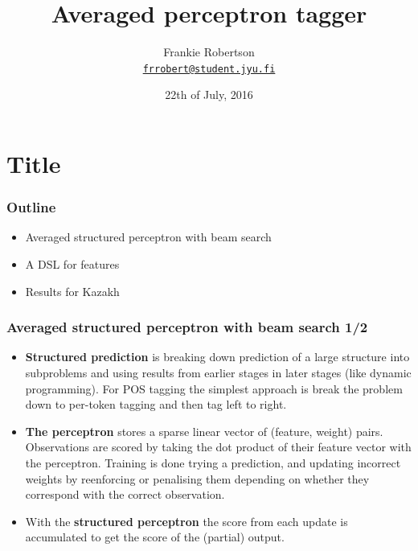 \documentclass{beamer}
\title[POS tagger internals]{Averaged perceptron tagger}
\institute[JYU]{University of Jyväskylä\\
\vspace{5mm}
\url{https://www.github.com/frankier/perceptron-tagger-slides/}}
\author[Frankie Robertson]{Frankie Robertson\texorpdfstring{\\
\href{mailto:frrobert@student.jyu.fi}{\texttt{frrobert@student.jyu.fi}}}{}}
\date{22th of July, 2016}
\begin{document}
\section{Title}
\begin{frame}
  \titlepage{}
\end{frame}

\begin{frame}
\frametitle{Outline}
\begin{itemize}

  \item Averaged structured perceptron with beam search

  \item A DSL for features

  \item Results for Kazakh

\end{itemize}
\end{frame}

\begin{frame}
\frametitle{Averaged structured perceptron with beam search 1/2}
\begin{itemize}

  \item \textbf{Structured prediction} is breaking down prediction of a large
    structure into subproblems and using results from earlier stages in later
    stages (like dynamic programming). For POS tagging the simplest approach is
    break the problem down to per-token tagging and then tag left to right.

  \item \textbf{The perceptron} stores a sparse linear vector of (feature,
    weight) pairs.  Observations are scored by taking the dot product of their
    feature vector with the perceptron. Training is done trying a prediction,
    and updating incorrect weights by reenforcing or penalising them depending
    on whether they correspond with the correct observation.

  \item With the \textbf{structured perceptron} the score from each update is
    accumulated to get the score of the (partial) output.

\end{itemize}
\end{frame}
\end{document}

